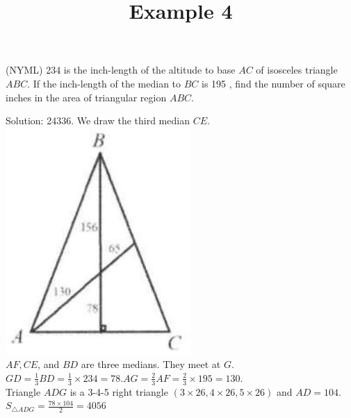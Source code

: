 \documentclass{article}
\title{Example 4}
\date{}
\begin{document}
\maketitle

(NYML) 234 is the inch-length of the altitude to base \(A C\) of isosceles triangle \(A B C\). If the inch-length of the median to \(B C\) is 195 , find the number of square inches in the area of triangular region \(A B C\).

Solution: 24336.
We draw the third median \(C E\).\\
\centering
\includegraphics[width=\textwidth]{images/problem_image_1.jpg}\\
\(A F, C E\), and \(B D\) are three medians. They meet at \(G\).\\
\(G D=\frac{1}{3} B D=\frac{1}{3} \times 234=78 . A G=\frac{2}{3} A F=\frac{2}{3} \times 195=130\).\\
Triangle \(A D G\) is a 3-4-5 right triangle \((3 \times 26,4 \times 26,5 \times 26)\) and \(A D=104\).\\
\(S_{\triangle A D G}=\frac{78 \times 104}{2}=4056\)\\
\end{document}
